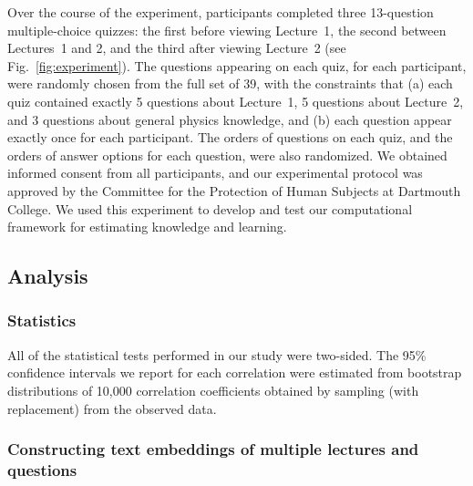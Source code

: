 \documentclass[10pt]{article}
\begin{document}
Over the course of the experiment, participants completed three 13-question
multiple-choice quizzes: the first before viewing Lecture~1, the second between
Lectures~1 and 2, and the third after viewing Lecture~2 (see
Fig.~\ref{fig:experiment}). The questions appearing on each quiz, for each
participant, were randomly chosen from the full set of 39, with the constraints
that (a) each quiz contained exactly 5 questions about Lecture~1, 5 questions
about Lecture~2, and 3 questions about general physics knowledge, and (b) each
question appear exactly once for each participant. The orders of questions on
each quiz, and the orders of answer options for each question, were also
randomized. We obtained informed consent from all participants, and our
experimental protocol was approved by the Committee for the Protection of Human
Subjects at Dartmouth College. We used this experiment to develop and test our
computational framework for estimating knowledge and learning.

\subsection*{Analysis}

\subsubsection*{Statistics}

All of the statistical tests performed in our study were two-sided. The 95\%
confidence intervals we report for each correlation were estimated from
bootstrap distributions of 10,000 correlation coefficients obtained by
sampling (with replacement) from the observed data.

\subsubsection*{Constructing text embeddings of multiple lectures and questions}\label{subsec:topic-modeling}
\end{document}

